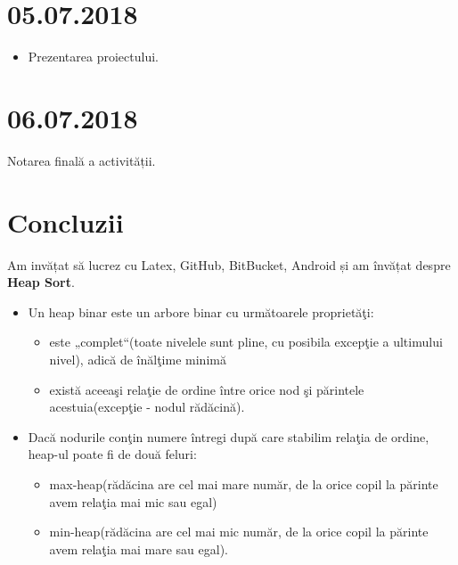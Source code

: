 \documentclass{report}
\begin{document}
\chapter{05.07.2018}
\begin{itemize}
    \item Prezentarea proiectului.
\end{itemize}
\chapter{06.07.2018}
Notarea finală a activității.

\chapter{Concluzii}
Am invățat să lucrez cu Latex, GitHub, BitBucket, Android și am învățat despre \textbf{Heap Sort}.
\begin{itemize}
    \item Un heap binar este un arbore binar cu următoarele proprietăţi:
    \begin{itemize}
        \item este „complet“(toate nivelele sunt pline, cu posibila excepţie a ultimului nivel), adică de înălţime minimă
        \item există aceeaşi relaţie de ordine între orice nod şi părintele acestuia(excepţie - nodul rădăcină).
    \end{itemize}
    \item Dacă nodurile conţin numere întregi după care stabilim relaţia de ordine, heap-ul poate fi de două feluri:
    \begin{itemize}
        \item max-heap(rădăcina are cel mai mare număr, de la orice copil la părinte avem relaţia mai mic sau egal)
        \item min-heap(rădăcina are cel mai mic număr, de la orice copil la părinte avem relaţia mai mare sau egal).
    \end{itemize}
\end{itemize}
\end{document}

